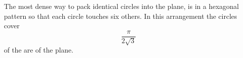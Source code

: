  The most dense way to pack identical circles into the plane, is
in a hexagonal pattern so that each circle touches six others.
In this arrangement the circles cover 
\[ \frac{\pi}{2 \sqrt{3}} \] of the are of the plane.
